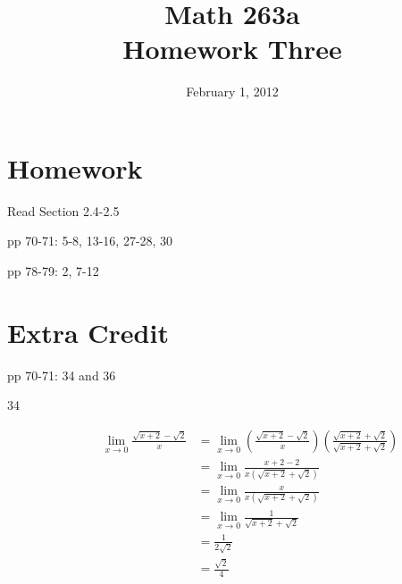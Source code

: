\documentclass{exam}
\title{Math 263a \\ Homework Three}
\date{February 1, 2012}
\begin{document}
\maketitle

\section{Homework}

\begin{itemize*}
  \item Read Section 2.4-2.5
  \item pp 70-71: 5-8, 13-16, 27-28, 30
  \item pp 78-79: 2, 7-12
\end{itemize*}

\section{Extra Credit}
\begin{itemize*}
\item pp 70-71: 34 and 36
\end{itemize*}

\ifprintanswers

\begin{description}
\item[34]
\begin{align*}
  \lim_{x \to 0} \frac{\sqrt{x+2} - \sqrt{2}}{x} 
    &= \lim_{x \to 0} \left( \frac{\sqrt{x+2} - \sqrt{2}}{x} \right) \left( \frac{\sqrt{x+2} + \sqrt{2}}{\sqrt{x+2} + \sqrt{2}} \right) \\
    &= \lim_{x \to 0} \frac{x+2 - 2}{x(\sqrt{x+2} + \sqrt{2})}  \\
    &= \lim_{x \to 0} \frac{x}{x(\sqrt{x+2} + \sqrt{2})} \\
    &= \lim_{x \to 0} \frac{1}{\sqrt{x+2} + \sqrt{2}} \\
    &= \frac{1}{2 \sqrt{2}} \\
    &= \frac{\sqrt{2}}{4} \\
\end{align*}
\end{description}
\end{document}
